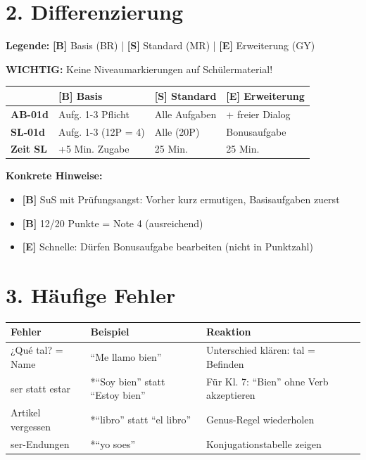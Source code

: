 \documentclass[11pt, a4paper]{article}
\newcommand{\B}{\textcolor{basis}{\textbf{[B]}}}
\newcommand{\Std}{\textcolor{standard}{\textbf{[S]}}}
\newcommand{\E}{\textcolor{erweiterung}{\textbf{[E]}}}
\begin{document}
\section*{2. Differenzierung}

\begin{differenzierung}
\textbf{Legende:} \B{} Basis (BR) | \Std{} Standard (MR) | \E{} Erweiterung (GY)

\textbf{WICHTIG:} Keine Niveaumarkierungen auf Schülermaterial!
\end{differenzierung}

\vspace{1em}

\begin{tabularx}{\textwidth}{|l|X|X|X|}
\hline
& \B{} \textbf{Basis} & \Std{} \textbf{Standard} & \E{} \textbf{Erweiterung} \\
\hline
\textbf{AB-01d} & Aufg. 1-3 Pflicht & Alle Aufgaben & + freier Dialog \\
\hline
\textbf{SL-01d} & Aufg. 1-3 (12P = 4) & Alle (20P) & Bonusaufgabe \\
\hline
\textbf{Zeit SL} & +5 Min. Zugabe & 25 Min. & 25 Min. \\
\hline
\end{tabularx}

\vspace{1em}

\textbf{Konkrete Hinweise:}
\begin{itemize}
    \item \B{} SuS mit Prüfungsangst: Vorher kurz ermutigen, Basisaufgaben zuerst
    \item \B{} 12/20 Punkte = Note 4 (ausreichend)
    \item \E{} Schnelle: Dürfen Bonusaufgabe bearbeiten (nicht in Punktzahl)
\end{itemize}

\section*{3. Häufige Fehler}

\begin{fehlerbox}
\begin{tabularx}{\textwidth}{|l|X|X|}
\hline
\textbf{Fehler} & \textbf{Beispiel} & \textbf{Reaktion} \\
\hline
¿Qué tal? = Name & ``Me llamo bien'' & Unterschied klären: tal = Befinden \\
\hline
ser statt estar & *``Soy bien'' statt ``Estoy bien'' & Für Kl. 7: ``Bien'' ohne Verb akzeptieren \\
\hline
Artikel vergessen & *``libro'' statt ``el libro'' & Genus-Regel wiederholen \\
\hline
ser-Endungen & *``yo soes'' & Konjugationstabelle zeigen \\
\hline
\end{tabularx}
\end{fehlerbox}
\end{document}
